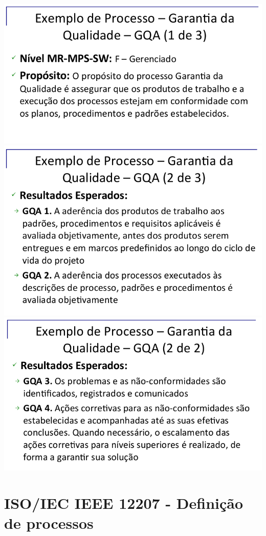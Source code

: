 \documentclass{article}
\begin{document}
\includegraphics[scale=0.30]{exemplo_garantia_qualidade_1}
\includegraphics[scale=0.30]{exemplo_garantia_qualidade_2}
\includegraphics[scale=0.30]{exemplo_garantia_qualidade_3}

\section{ISO/IEC IEEE 12207 - Definição de processos}
\date{03/09/2014}
\end{document}

